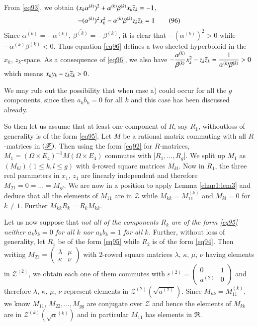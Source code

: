 From \eqref{eq93}, we obtain
$(x_{k}\alpha^{(k)})^{2}+\alpha^{(k)}\beta^{(k)}x_{k}\overline{z}_{k}=-1$,
\ie
\begin{equation*}
-(\alpha^{(k)})^{2}x^{2}_{k}-\alpha^{(k)}
\beta^{(k)}z_{k}\overline{z}_{k}=1\tag{96}\label{eq96} 
\end{equation*}
Since $\overline{\alpha^{(k)}}=-\alpha^{(k)}$,
$\overline{\beta^{(k)}}=-\beta^{(k)}$, it is clear that
$-(\alpha^{(k)})^{2}>0$ while $-\alpha^{(k)}\beta^{(k)}<0$. Thus
equation \eqref{eq96} defines a two-sheeted hyperboloid in the $x_{k}$,
$z_{k}$-space. As a consequence of \eqref{eq96}, we also have
$-\dfrac{\alpha^{(k)}}{\beta^{(k)}}x^{2}_{k}-z_{k}
\overline{z}_{k}=\dfrac{1}{\alpha^{(k)}\beta^{(k)}}>0$
which means $x_{k}y_{k}-z_{k}\overline{z}_{k}>0$.

We may rule out the possibility that when case a) could occur for all
the $g$ components, since then $a_{k}b_{k}=0$ for all $k$ and this
case has been discussed already.

So then let us assume that at least one component of $R$, say $R_{1}$,
without\pageoriginale loss of generality is of the form
\eqref{eq95}. Let $M$ be a rational matrix commuting with all
$R$-matrices in $(\underline{\mathscr{F}})$. Then using the form \eqref{eq92}
for $R$-matrices, $M_{1}=(\Omega\times E_{4})^{-1}M(\Omega\times
E_{4})$ commutes with $\big[R_{1},\ldots,R_{g}\big]$. We split up $M_{1}$ as
$(M_{kl})(1\leq k,l\leq g)$ with 4-rowed square matrices
$M_{kl}$. Now in $R_{1}$, the three real parameters in $x_{1}$,
$z_{1}$ are linearly independent and therefore
$M_{21}=0=\ldots=M_{gl}$. We are now in a position to apply Lemma
\ref{chap1:lem3} and deduce that all the elements of $M_{11}$ are in
$\mathscr{Z}$ while $M_{kk}=M^{(k)}_{11}$ and $M_{kl}=0$ for $k\neq
1$. Further $M_{kk}R_{k}=R_{k}M_{kk}$. 

Let us now suppose that {\em not all of the components $R_{k}$ are of
  the form \eqref{eq95} \ie neither $a_{k}b_{k}=0$ for all $k$ nor
  $a_{k}b_{k}=1$ for all $k$.} Further, without loss of generality,
let $R_{1}$ be of the form \eqref{eq95} while $R_{2}$ is of the form
\eqref{eq94}. Then writing $M_{22}=\left(\begin{smallmatrix} \lambda &
  \mu\\ \kappa & \nu\end{smallmatrix}\right)$ with $2$-rowed square
  matrices $\lambda$, $\kappa$, $\mu$, $\nu$ having elements in
  $\mathscr{Z}^{(2)}$, we obtain each one of them commutes with
  $\varepsilon^{(2)}=\left(\begin{smallmatrix} 0 & 1\\ a^{(2)} & 0
  \end{smallmatrix}\right)$ and therefore $\lambda$, $\kappa$, $\mu$,
  $\nu$ represent elements in
  $\mathscr{Z}^{(2)}(\sqrt{a^{(2)}})$. Since $M_{kk}=M^{(k)}_{11}$, we
  know $M_{11}$, $M_{22},\ldots, M_{gg}$ are conjugate over
  $\mathscr{Z}$ and hence the elements of $M_{kk}$ are in
  $\mathscr{Z}^{(k)}(\sqrt{a}^{(k)})$ and in particular $M_{11}$ has
  elements in $\mathfrak{R}$.

